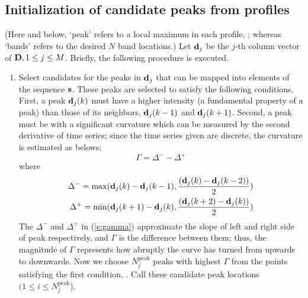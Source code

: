 \subsection{Initialization of candidate peaks from profiles}\label{ss:preproc}
 (Here and below, `peak' refers to a local maximum in each profile, ; whereas `bands' refers to the desired $N$ band locations.) Let ${\mathbf{d}}_j$ be the $j$-th column vector of ${\mathbf{D}}, 1 \le j \le M$. Briefly, the following procedure is executed.
%
\begin{enumerate}
\item Select candidates for the peaks in ${\mathbf{d}}_j$ that can be mapped into elements of the sequence ${\mathbf{s}}$. These peaks are selected to satisfy the following conditions. First, a peak ${\mathbf{d}}_j(k)$ must have a higher intensity (a fundamental property of a peak) than those of its neighbors, ${\mathbf{d}}_j(k-1)$ and ${\mathbf{d}}_j(k+1)$. Second, a peak must be with a significant curvature which can be measured by the second derivative of time series; since the time series given are discrete, the curvature is estimated as belows:
%
\begin{equation}\label{e:gamma}
\Gamma = \Delta^- - \Delta^+
\end{equation}
%
where
%
\begin{eqnarray}
\Delta^- = \max( {\mathbf{d}}_j(k)-{\mathbf{d}}_j(k-1), {{({\mathbf{d}}_j(k)-{\mathbf{d}}_j(k-2))}\over{2}}) \nonumber \\
\Delta^+ = \min( {\mathbf{d}}_j(k+1)-{\mathbf{d}}_j(k), {{({\mathbf{d}}_j(k+2)-{\mathbf{d}}_j(k))}\over{2}}) \nonumber
\end{eqnarray}
%
The $\Delta^-$ and $\Delta^+$ in (\ref{e:gamma}) approximate the slope of left and right side of peak respectively, and $\Gamma$ is the difference between them; thus, the magnitude of $\Gamma$ represents how abruptly the curve has turned from upwards to downwards. Now we choose $N^\textrm{peak}_j$ peaks with highest $\Gamma$ from the points satisfying the first condition, . Call these candidate peak locations  $(1 \le i \le N^\textrm{peak}_j$).


\end{enumerate}
